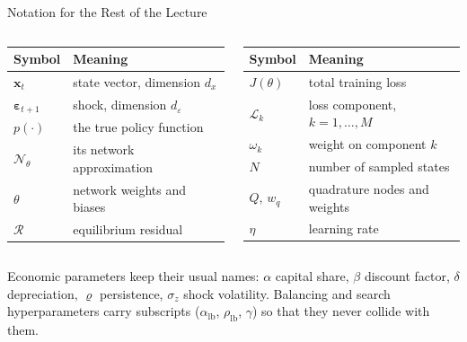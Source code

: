 \documentclass[aspectratio=169,11pt]{beamer}
\newcommand{\x}{\bm{x}}
\newcommand{\param}{\theta}          %
\newcommand{\state}{\bm{x}}          %
\newcommand{\resid}{\mathcal{R}}     %
\newcommand{\net}{\mathcal{N}_{\param}} %
\begin{document}
\begin{frame}{Notation for the Rest of the Lecture}
\begin{columns}[T]
\begin{tabular}{@{}ll@{}}
\toprule
\textbf{Symbol} & \textbf{Meaning} \\
\midrule
$\state_t$          & state vector, dimension $d_x$ \\
$\bm\varepsilon_{t+1}$ & shock, dimension $d_\varepsilon$ \\
$p(\cdot)$          & the true policy function \\
$\net$              & its network approximation \\
$\param$            & network weights and biases \\
$\resid$            & equilibrium residual \\
\bottomrule
\end{tabular}

\begin{tabular}{@{}ll@{}}
\toprule
\textbf{Symbol} & \textbf{Meaning} \\
\midrule
$J(\param)$         & total training loss \\
$\mathcal{L}_k$     & loss component, $k=1,\dots,M$ \\
$\omega_k$          & weight on component $k$ \\
$N$                 & number of sampled states \\
$Q$, $w_q$          & quadrature nodes and weights \\
$\eta$              & learning rate \\
\bottomrule
\end{tabular}
\end{columns}

\vspace{0.6em}
\begin{center}
{\footnotesize Economic parameters keep their usual names: $\alpha$ capital share, $\beta$ discount factor, $\delta$ depreciation, $\varrho$ persistence, $\sigma_z$ shock volatility. Balancing and search hyperparameters carry subscripts ($\alpha_{\mathrm{lb}}$, $\rho_{\mathrm{lb}}$, $\gamma$) so that they never collide with them.}
\end{center}
\end{frame}
\end{document}
